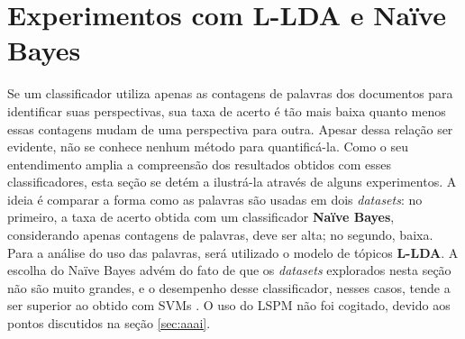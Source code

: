 \section{Experimentos com L-LDA e Naïve Bayes}
\label{freqs:experim}

Se um classificador utiliza apenas as contagens de palavras dos documentos para identificar suas perspectivas, sua taxa de acerto é tão mais baixa quanto menos essas contagens mudam de uma perspectiva para outra. Apesar dessa relação ser evidente, não se conhece nenhum método para quantificá-la. Como o seu entendimento amplia a compreensão dos resultados obtidos com esses classificadores, esta seção se detém a ilustrá-la através de alguns experimentos. A ideia é comparar a forma como as palavras são usadas em dois \emph{datasets}: no primeiro, a taxa de acerto obtida com um classificador \textbf{Naïve Bayes}, considerando apenas contagens de palavras, deve ser alta; no segundo, baixa. Para a análise do uso das palavras, será utilizado o modelo de tópicos \textbf{L-LDA}. A escolha do Naïve Bayes advém do fato de que os \emph{datasets} explorados nesta seção não são muito grandes, e o desempenho desse classificador, nesses casos, tende a ser superior ao obtido com SVMs \cite{ng-jordan}. O uso do LSPM não foi cogitado, devido aos pontos discutidos na seção \ref{sec:aaai}.


